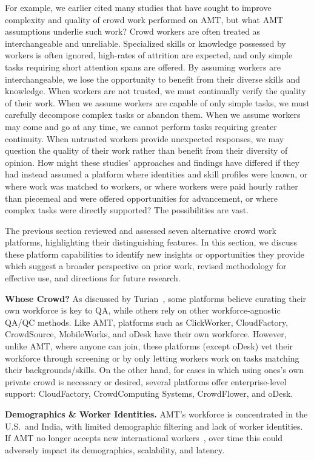 \documentclass{sigchi}
\begin{document}
For example, we earlier cited many studies that have sought to improve complexity and quality of crowd work performed on AMT, but what AMT assumptions underlie such work? Crowd workers are often treated as interchangeable and unreliable. Specialized skills or knowledge possessed by workers is often ignored, high-rates of attrition are expected, and only simple tasks requiring short attention spans are offered. By assuming workers are interchangeable, we lose the opportunity to benefit from their diverse skills and knowledge. When workers are not trusted, we must continually verify the quality of their work. When we assume workers are capable of only simple tasks, we must carefully decompose complex tasks or abandon them. When we assume workers may come and go at any time, we cannot perform tasks requiring greater continuity. When untrusted workers provide unexpected responses, we may question the quality of their work rather than benefit from their diversity of opinion. How might these studies' approaches and findings have differed if they had instead assumed a platform where identities and skill profiles were known, or where work was matched to workers, or where workers were paid hourly rather than piecemeal and were offered opportunities for advancement, or where complex tasks were directly supported? The possibilities are vast.

The previous section reviewed and assessed seven alternative crowd work platforms, highlighting their distinguishing features. In this section, we discuss these platform capabilities to identify new insights or opportunities they provide which suggest a broader perspective on prior work, revised methodology for effective use, and directions for future research.  

{\bf Whose Crowd?} As discussed by Turian~\cite{Turian12}, some platforms believe curating their own workforce is key to QA, while others rely on other workforce-agnostic QA/QC methods. Like AMT, platforms such as ClickWorker, CloudFactory, CrowdSource, MobileWorks, and oDesk have their own workforce. However, unlike AMT, where anyone can join, these platforms (except oDesk) vet their workforce through screening or by only letting workers work on tasks matching their backgrounds/skills. 
On the other hand, for cases in which using ones's own private crowd is necessary or desired, several platforms offer enterprise-level support: CloudFactory, CrowdComputing Systems, CrowdFlower, and oDesk.

{\bf Demographics \& Worker Identities.} AMT's workforce is concentrated in the U.S.\ and India, with limited demographic filtering and lack of worker identities. If AMT no longer accepts new international workers~\cite{no-intl}, over time this could adversely impact its demographics, scalability, and latency.
\end{document}
